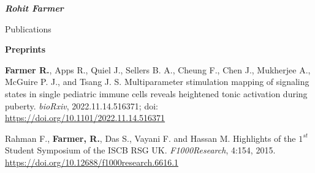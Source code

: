 \documentclass[10pt]{article}
\begin{document}
\begin{cv}{\huge \it \bfseries Rohit Farmer}
\begin{cvlist}{Publications}
\vskip3pt
\item {\textbf{Preprints}}
\begin{etaremune}
\item \textbf{Farmer R.}, Apps R., Quiel J., Sellers B. A., Cheung F., Chen J., Mukherjee A., McGuire P. J., and Tsang J. S. Multiparameter stimulation mapping of signaling states in single pediatric immune cells reveals heightened tonic activation during puberty. \emph{bioRxiv}, 2022.11.14.516371; doi: \url{https://doi.org/10.1101/2022.11.14.516371} 
\item Rahman F., \textbf{Farmer, R.}, Das S., Vayani F. and Hassan M. Highlights of the $1^{st}$ Student Symposium of the ISCB RSG UK. \emph{F1000Research}, 4:154, 2015. \url{https://doi.org/10.12688/f1000research.6616.1} 
\end{etaremune}

\end{cvlist}
\end{cv}
\end{document}

